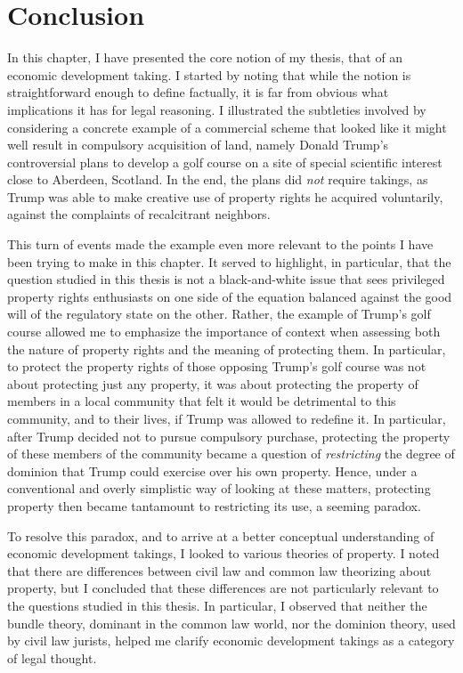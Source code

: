 \section{Conclusion}

In this chapter, I have presented the core notion of my thesis, that of an economic development taking. I started by noting that while the notion is straightforward enough to define factually, it is far from obvious what implications it has for legal reasoning. I illustrated the subtleties involved by considering a concrete example of a commercial scheme that looked like it might well result in compulsory acquisition of land, namely Donald Trump's controversial plans to develop a golf course on a site of special scientific interest close to Aberdeen, Scotland. In the end, the plans did {\it not} require takings, as Trump was able to make creative use of property rights he acquired voluntarily, against the complaints of recalcitrant neighbors.

This turn of events made the example even more relevant to the points I have been trying to make in this chapter. It served to highlight, in particular, that the question studied in this thesis is not a black-and-white issue that sees privileged property rights enthusiasts on one side of the equation balanced against the good will of the regulatory state on the other. Rather, the example of Trump's golf course allowed me to emphasize the importance of context when assessing both the nature of property rights and the meaning of protecting them. In particular, to protect the property rights of those opposing Trump's golf course was not about protecting just any property, it was about protecting the property of members in a local community that felt it would be detrimental to this community, and to their lives, if Trump was allowed to redefine it. In particular, after Trump decided not to pursue compulsory purchase, protecting the property of these members of the community became a question of {\it restricting} the degree of dominion that Trump could exercise over his own property. Hence, under a conventional and overly simplistic way of looking at these matters, protecting property then became tantamount to restricting its use, a seeming paradox.

To resolve this paradox, and to arrive at a better conceptual understanding of economic development takings, I looked to various theories of property. I noted that there are differences between civil law and common law theorizing about property, but I concluded that these differences are not particularly relevant to the questions studied in this thesis. In particular, I observed that neither the bundle theory, dominant in the common law world, nor the dominion theory, used by civil law jurists, helped me clarify economic development takings as a category of legal thought.

